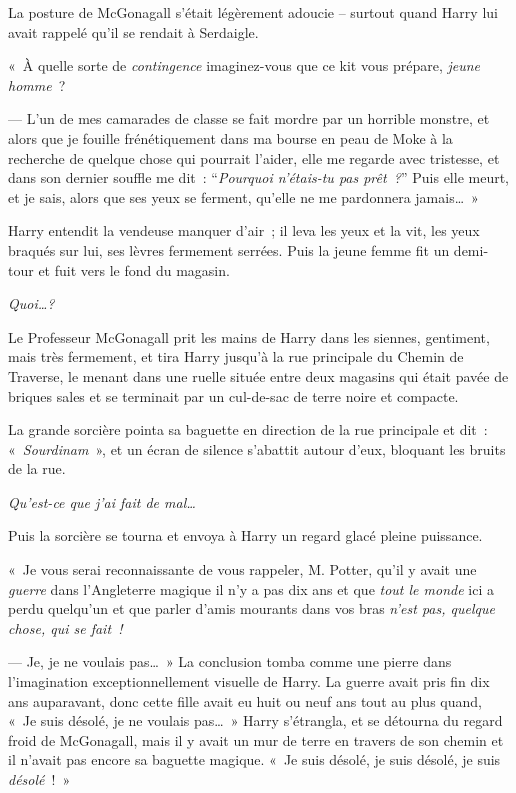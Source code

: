 La posture de McGonagall s'était légèrement adoucie -- surtout quand Harry lui avait rappelé qu'il se rendait à Serdaigle.

«~À quelle sorte de \emph{contingence} imaginez-vous que ce kit vous prépare, \emph{jeune homme}~?

--- L'un de mes camarades de classe se fait mordre par un horrible monstre, et alors que je fouille frénétiquement dans ma bourse en peau de Moke à la recherche de quelque chose qui pourrait l'aider, elle me regarde avec tristesse, et dans son dernier souffle me dit~: “\emph{Pourquoi n'étais-tu pas prêt~?}” Puis elle meurt, et je sais, alors que ses yeux se ferment, qu'elle ne me pardonnera jamais…~»

Harry entendit la vendeuse manquer d'air~; il leva les yeux et la vit, les yeux braqués sur lui, ses lèvres fermement serrées. Puis la jeune femme fit un demi-tour et fuit vers le fond du magasin.

\emph{Quoi…?}

Le Professeur McGonagall prit les mains de Harry dans les siennes, gentiment, mais très fermement, et tira Harry jusqu'à la rue principale du Chemin de Traverse, le menant dans une ruelle située entre deux magasins qui était pavée de briques sales et se terminait par un cul-de-sac de terre noire et compacte.

La grande sorcière pointa sa baguette en direction de la rue principale et dit~: «~\emph{Sourdinam}~», et un écran de silence s'abattit autour d'eux, bloquant les bruits de la rue.

\emph{Qu'est-ce que j'ai fait de mal…}

Puis la sorcière se tourna et envoya à Harry un regard glacé pleine puissance.

«~Je vous serai reconnaissante de vous rappeler, M. Potter, qu'il y avait une \emph{guerre} dans l'Angleterre magique il n'y a pas dix ans et que \emph{tout le monde} ici a perdu quelqu'un et que parler d'amis mourants dans vos bras \emph{n'est pas, quelque chose, qui se fait~!}

--- Je, je ne voulais pas…~» La conclusion tomba comme une pierre dans l'imagination exceptionnellement visuelle de Harry. La guerre avait pris fin dix ans auparavant, donc cette fille avait eu huit ou neuf ans tout au plus quand, «~Je suis désolé, je ne voulais pas…~» Harry s'étrangla, et se détourna du regard froid de McGonagall, mais il y avait un mur de terre en travers de son chemin et il n'avait pas encore sa baguette magique. «~Je suis désolé, je suis désolé, je suis \emph{désolé}~!~»

